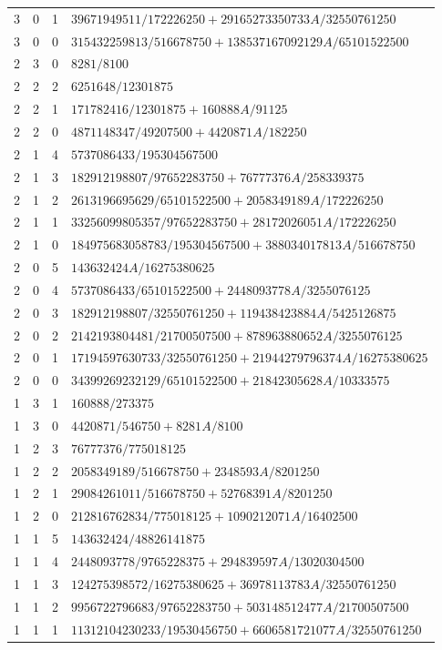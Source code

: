 \begin{longtable}{rrrl}
3 & 0 & 1 & $39671949511/172226250+29165273350733A/32550761250$\\
3 & 0 & 0 & $315432259813/516678750+138537167092129A/65101522500$\\
2 & 3 & 0 & $8281/8100$\\
2 & 2 & 2 & $6251648/12301875$\\
2 & 2 & 1 & $171782416/12301875+160888A/91125$\\
2 & 2 & 0 & $4871148347/49207500+4420871A/182250$\\
2 & 1 & 4 & $5737086433/195304567500$\\
2 & 1 & 3 & $182912198807/97652283750+76777376A/258339375$\\
2 & 1 & 2 & $2613196695629/65101522500+2058349189A/172226250$\\
2 & 1 & 1 & $33256099805357/97652283750+28172026051A/172226250$\\
2 & 1 & 0 & $184975683058783/195304567500+388034017813A/516678750$\\
2 & 0 & 5 & $143632424A/16275380625$\\
2 & 0 & 4 & $5737086433/65101522500+2448093778A/3255076125$\\
2 & 0 & 3 & $182912198807/32550761250+119438423884A/5425126875$\\
2 & 0 & 2 & $2142193804481/21700507500+878963880652A/3255076125$\\
2 & 0 & 1 & $17194597630733/32550761250+21944279796374A/16275380625$\\
2 & 0 & 0 & $34399269232129/65101522500+21842305628A/10333575$\\
1 & 3 & 1 & $160888/273375$\\
1 & 3 & 0 & $4420871/546750+8281A/8100$\\
1 & 2 & 3 & $76777376/775018125$\\
1 & 2 & 2 & $2058349189/516678750+2348593A/8201250$\\
1 & 2 & 1 & $29084261011/516678750+52768391A/8201250$\\
1 & 2 & 0 & $212816762834/775018125+1090212071A/16402500$\\
1 & 1 & 5 & $143632424/48826141875$\\
1 & 1 & 4 & $2448093778/9765228375+294839597A/13020304500$\\
1 & 1 & 3 & $124275398572/16275380625+36978113783A/32550761250$\\
1 & 1 & 2 & $9956722796683/97652283750+503148512477A/21700507500$\\
1 & 1 & 1 & $11312104230233/19530456750+6606581721077A/32550761250$\\

\end{longtable}
